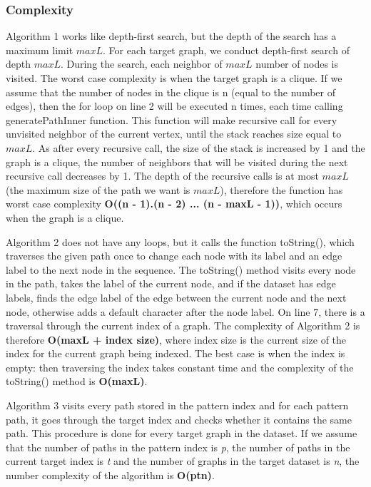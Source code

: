 \documentclass{l4proj}
\begin{document}
\subsubsection{Complexity}
\label{path-index:complexity}
Algorithm 1 works like depth-first search, but the depth of the search has a maximum limit $maxL$. For each target graph, we conduct depth-first search of depth $maxL$. During the search, each neighbor of $maxL$ number of nodes is visited. The worst case complexity is when the target graph is a clique. If we assume that the number of nodes in the clique is n (equal to the number of edges), then the for loop on line 2 will be executed n times, each time calling \textrm{generatePathInner} function. This function will make recursive call for every unvisited neighbor of the current vertex, until the stack reaches size equal to $maxL$. As after every recursive call, the size of the stack is increased by 1 and the graph is a clique, the number of neighbors that will be visited during the next recursive call decreases by 1. The depth of the recursive calls is at most $maxL$ (the maximum size of the path we want  is $maxL$), therefore the function has worst case complexity \textbf{O((n - 1).(n - 2) ... (n - maxL - 1))}, which occurs when the graph is a clique. \par
 Algorithm 2 does not have any loops, but it calls the function \textrm{toString()}, which traverses the given path once to change each node with its label and an edge label to the next node in the sequence. The \textrm{toString()} method visits every node in the path, takes the label of the current node, and if the dataset has edge labels, finds the edge label of the edge between the current node and the next node, otherwise adds a default character after the node label. On line 7, there is a traversal through the current index of a graph. The complexity of Algorithm 2 is therefore \textbf{O(maxL + index size)}, where index size is the current size of the index for the current graph being indexed. The best case is when the index is empty: then traversing the index takes constant time and the complexity of the \textrm{toString()} method is \textbf{O(maxL)}.\par
Algorithm 3 visits every path stored in the pattern index and for each pattern path, it goes through the target index and checks whether it contains the same path. This procedure is done for every target graph in the dataset. If we assume that the number of paths in the pattern index is \textit{p}, the number of paths in the current target index is \textit{t} and the number of graphs in the target dataset is \textit{n}, the number complexity of the algorithm is \textbf{O(ptn)}.\par
\end{document}

